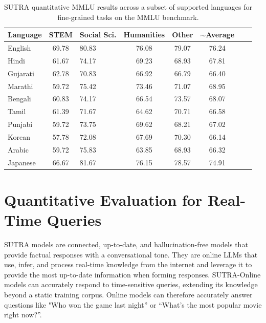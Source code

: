 \documentclass{article}
\begin{document}
\begin{table}[tb]
\setlength{\abovecaptionskip}{10pt} %
\setlength{\belowcaptionskip}{5pt} %
\centering

  \begin{tabular}{lclccccc}
  \toprule
    \textbf{Language}  & \textbf{STEM} & \textbf{Social Sci.} & \textbf{Humanities} & \textbf{Other} & \textbf{$\sim$Average} \\
  \midrule
  English  & 69.78 & 80.83 & 76.08 & 79.07 & 76.24 \\
  Hindi    & 61.67 & 74.17 & 69.23 & 68.93 & 67.81 \\
  Gujarati &  62.78 & 70.83 & 66.92 & 66.79 & 66.40 \\
  Marathi  &  59.72 & 75.42 & 73.46 & 71.07 & 68.95 \\
  Bengali  &  60.83 & 74.17 & 66.54 & 73.57 & 68.07 \\
  Tamil    &  61.39 & 71.67 & 64.62 & 70.71 & 66.58 \\
  Punjabi  &  59.72 & 73.75 & 69.62 & 68.21 & 67.02 \\
  Korean   & 57.78 & 72.08 & 67.69 & 70.30 & 66.14 \\
  Arabic   & 59.72 & 75.83 & 63.85 & 68.93 & 66.32 \\
  Japanese & 66.67 & 81.67 & 76.15 & 78.57 & 74.91 \\
  \bottomrule
  \end{tabular}

  \caption{
    SUTRA quantitative MMLU results across a subset of supported languages for fine-grained tasks on the MMLU benchmark.
  }

\label{table:quantitative_mmlu_results_sutra_pro}
\end{table}



 
\section{Quantitative Evaluation for Real-Time Queries}

SUTRA models are connected, up-to-date, and hallucination-free models that provide factual responses with a conversational tone. They are online LLMs that use, infer, and process real-time knowledge from the internet and leverage it to provide the most up-to-date information when forming responses. SUTRA-Online models can accurately respond to time-sensitive queries, extending its knowledge beyond a static training corpus. Online models can therefore accurately answer questions like "Who won the game last night” or “What’s the most popular movie right now?”.
\end{document}
